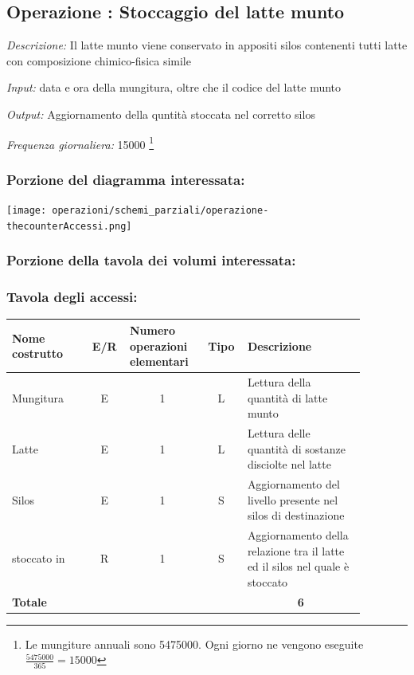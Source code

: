 \documentclass[12pt,a4paper]{article}
\begin{document}
\subsection*{Operazione \thecounterAccessi{}: Stoccaggio del latte munto}
\noindent\textit{Descrizione:} Il latte munto viene conservato in appositi silos contenenti tutti latte con composizione chimico-fisica simile

\noindent\textit{Input:} data e ora della mungitura, oltre che il codice del latte munto

\noindent\textit{Output:} Aggiornamento della quntità stoccata nel corretto silos

\noindent\textit{Frequenza giornaliera:} 15000 \footnote{Le mungiture annuali sono 5475000. Ogni giorno ne vengono eseguite $\frac{5475000}{365}=15000$}

\subsubsection*{Porzione del diagramma interessata:}

\texttt{[image: operazioni/schemi\_parziali/operazione-\\thecounterAccessi.png]} 
\subsubsection*{Porzione della tavola dei volumi interessata:}

\subsubsection*{Tavola degli accessi:}

\begin{center}\setlength{\extrarowheight}{1.5pt}\begin{longtable}{|p{0.2\linewidth}|p{0.1\linewidth}|p{0.175\linewidth}|p{0.1\linewidth}|p{0.3\linewidth}|}\hline \textbf{Nome costrutto}   & \multicolumn{1}{|c|}{\textbf{E/R}} & \textbf{Numero operazioni elementari} & \multicolumn{1}{|c|}{\textbf{Tipo}} & \textbf{Descrizione}\\ 
\hline
Mungitura
 & 
\multicolumn{1}{|c|}{E}
 & 
\multicolumn{1}{|c|}{1}
 & 
\multicolumn{1}{|c|}{L}
 & 
Lettura della quantità di latte munto
\\
\hline
Latte
 & 
\multicolumn{1}{|c|}{E}
 & 
\multicolumn{1}{|c|}{1}
 & 
\multicolumn{1}{|c|}{L}
 & 
Lettura delle quantità di sostanze disciolte nel latte
\\
\hline
Silos
 & 
\multicolumn{1}{|c|}{E}
 & 
\multicolumn{1}{|c|}{1}
 & 
\multicolumn{1}{|c|}{S}
 & 
Aggiornamento del livello presente nel silos di destinazione
\\
\hline
stoccato in
 & 
\multicolumn{1}{|c|}{R}
 & 
\multicolumn{1}{|c|}{1}
 & 
\multicolumn{1}{|c|}{S}
 & 
Aggiornamento della relazione tra il latte ed il silos nel quale è stoccato
\\
\hline
\multicolumn{4}{|l|}{\textbf{Totale}}
 & 
\multicolumn{1}{|c|}{\textbf{6}}
\\
\hline
\end{longtable}\end{center}
\end{document}
